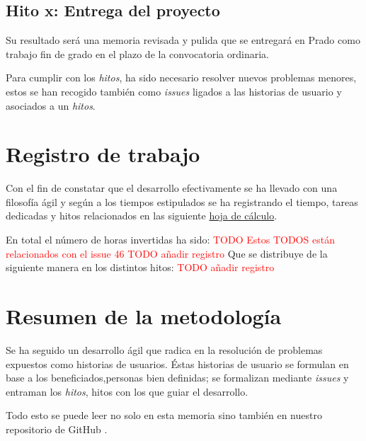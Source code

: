 \subsection*{Hito x: Entrega del proyecto}

Su resultado será una memoria revisada y pulida que se entregará en Prado como trabajo fin de grado en el plazo de la convocatoria ordinaria. 

Para cumplir con los \textit{hitos},  ha sido necesario resolver nuevos  problemas menores, estos se han
recogido también como \textit{issues} ligados a las historias de usuario y asociados a un  \textit{hitos}.

\section{Registro de trabajo}  

Con el fin de constatar que el desarrollo efectivamente se ha 
llevado con una filosofía ágil y según a los tiempos estipulados se ha registrando el tiempo, tareas dedicadas  y hitos relacionados
en las siguiente \href{https://docs.google.com/spreadsheets/d/1TCcKQIKjKW9sMSU2f6obN9gHgv3c8UEdjmONkBlv42M/edit?usp=sharing}{hoja de cálculo}.

En total el número de horas invertidas ha sido: 
\textcolor{red}{TODO Estos TODOS están relacionados con el issue 46}
\textcolor{red}{TODO añadir registro}
Que se distribuye de la siguiente manera en los distintos hitos: 
\textcolor{red}{TODO añadir registro}


\section{Resumen de la metodología}  

Se ha seguido un desarrollo ágil que radica en la resolución de problemas expuestos como historias de usuarios. 
Éstas historias de usuario se formulan en base a los beneficiados,personas bien definidas; se formalizan 
mediante \textit{issues} y entraman los \textit{hitos}, hitos con los que guiar el desarrollo.

Todo esto se puede leer no solo en esta memoria sino también en nuestro repositorio de GitHub \cite{TFG-Estudio-de-las-redes-neuronales}. 
 




